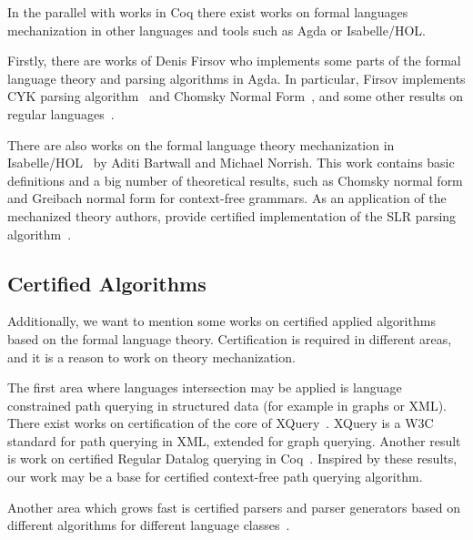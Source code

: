In the parallel with works in Coq there exist works on formal languages mechanization in other languages and tools such as Agda or Isabelle/HOL.

Firstly, there are works of Denis Firsov who implements some parts of the formal language theory and parsing algorithms in Agda.
In particular, Firsov implements CYK parsing algorithm~\cite{firsov2014certified,firsov2016cfl} and Chomsky Normal Form~\cite{firsov2015certified}, and some other results on regular languages~\cite{10.1007/978-3-319-03545-1_7}.

There are also works on the formal language theory mechanization in Isabelle/HOL~\cite{1885-16399,barthwal2010formalisation,10.1007/978-3-642-13824-9_11} by Aditi Bartwall and Michael Norrish.
This work contains basic definitions and a big number of theoretical results, such as Chomsky normal form and Greibach normal form for context-free grammars. 
As an application of the mechanized theory authors, provide certified implementation of the SLR parsing algorithm~\cite{10.1007/978-3-642-00590-9_12}.

\subsection{Certified Algorithms}

Additionally, we want to mention some works on certified applied algorithms based on the formal language theory.
Certification is required in different areas, and it is a reason to work on theory mechanization.

The first area where languages intersection may be applied is language constrained path querying in structured data (for example in graphs or XML).
There exist works on certification of the core of XQuery~\cite{10.1007/978-3-642-25379-9_21}. 
XQuery is a W3C standard for path querying in XML, extended for graph querying. 
Another result is work on certified Regular Datalog querying in Coq~\cite{certifiedPrologGraphQuerying}. 
Inspired by these results, our work may be a base for certified context-free path querying algorithm.

Another area which grows fast is certified parsers and parser generators based on different algorithms for different language classes~\cite{10.1007/978-3-642-28869-2_20,bernardy2016certified,Lopes2016CertifiedDP,Gross2015ParsingPA}. 
